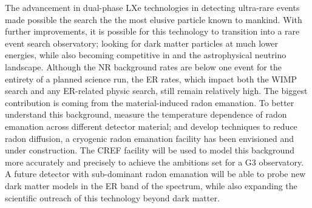 The advancement in dual-phase LXe technologies in detecting ultra-rare events made possible the search the the most elusive particle known to mankind. With further improvements, it is possible for this technology to transition into a rare event search observatory; looking for dark matter particles at much lower energies, while also becoming competitive in \neutrinolessDoubleBeta and the astrophysical neutrino landscape. Although the NR background rates are below one event for the entirety of a planned science run, the ER rates, which impact both the WIMP search and any ER-related physic search, still remain relatively high. The biggest contribution is coming from the material-induced radon emanation. To better understand this background, measure the temperature dependence of radon emanation across different detector material; and develop techniques to reduce radon diffusion, a cryogenic radon emanation facility has been envisioned and under construction. The CREF facility will be used to model this background more accurately and precisely to achieve the ambitions set for a G3 observatory. A future detector with sub-dominant radon emanation will be able to probe new dark matter models in the ER band of the spectrum, while also expanding the scientific outreach of this technology beyond dark matter.

\\